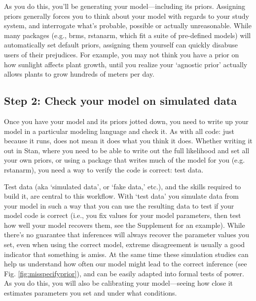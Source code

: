 \documentclass[11pt]{article}
\begin{document}
As you do this, you'll be generating your model---including its priors. Assigning priors generally forces you to think about your model with regards to your study system, and interrogate what's probable, possible or actually unreasonable. While many packages (e.g., \textsf{brms, rstanarm}, which fit a suite of pre-defined models) will automatically set default priors, assigning them yourself can quickly disabuse users of their prejudices. For example, you may not think you have a prior on how sunlight affects plant growth, until you realize your `agnostic prior' actually allows plants to grow hundreds of meters per day. %

\subsection*{Step 2: Check your model on simulated data} 

Once you have your model and its priors jotted down, you need to write up your model in a particular modeling language and check it. As with all code: just because it runs, does not mean it does what you think it does. Whether writing it out in \textsf{Stan}, where you need to be able to write out the full likelihood and set all your own priors, or using a package that writes much of the model for you (e.g. \textsf{rstanarm}), you need a way to verify the code is correct: test data.

Test data (aka `simulated data', or  `fake data,' etc.), and the skills required to build it, are central to this workflow. With `test data' you simulate data from your model in such a way that you can use the resulting data to test if your model code is correct (i.e., you fix values for your model parameters, then test how well your model recovers them, see the Supplement for an example). While there's no guarantee that inferences will always recover the parameter values you set, even when using the correct model, extreme disagreement is usually a good indicator that something is amiss. At the same time these simulation studies can help us understand how often our model might lead to the correct inference (see Fig. \ref{fig:misspecifyprior}), and can be easily adapted into formal tests of power. As you do this, you will also be calibrating your model---seeing how close it estimates parameters you set and under what conditions. 
\end{document}
